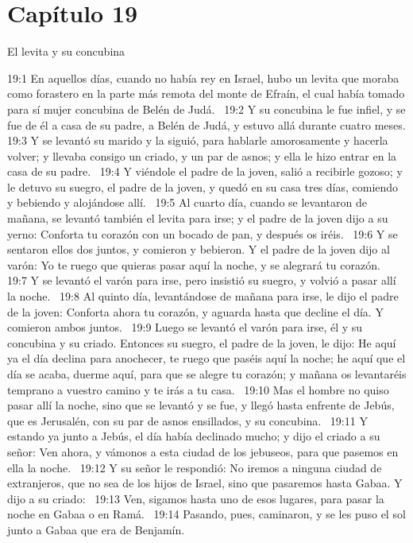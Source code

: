 \section*{Capítulo 19}
El levita y su concubina  

19:1 En aquellos días, cuando no había rey en Israel, hubo un levita que moraba como forastero en la parte más remota del monte de Efraín, el cual había tomado para sí mujer concubina de Belén de Judá.  
19:2 Y su concubina le fue infiel, y se fue de él a casa de su padre, a Belén de Judá, y estuvo allá durante cuatro meses. 
19:3 Y se levantó su marido y la siguió, para hablarle amorosamente y hacerla volver; y llevaba consigo un criado, y un par de asnos; y ella le hizo entrar en la casa de su padre.  
19:4 Y viéndole el padre de la joven, salió a recibirle gozoso; y le detuvo su suegro, el padre de la joven, y quedó en su casa tres días, comiendo y bebiendo y alojándose allí.  
19:5 Al cuarto día, cuando se levantaron de mañana, se levantó también el levita para irse; y el padre de la joven dijo a su yerno: Conforta tu corazón con un bocado de pan, y después os iréis.  
19:6 Y se sentaron ellos dos juntos, y comieron y bebieron. Y el padre de la joven dijo al varón: Yo te ruego que quieras pasar aquí la noche, y se alegrará tu corazón.  
19:7 Y se levantó el varón para irse, pero insistió su suegro, y volvió a pasar allí la noche.  
19:8 Al quinto día, levantándose de mañana para irse, le dijo el padre de la joven: Conforta ahora tu corazón, y aguarda hasta que decline el día. Y comieron ambos juntos.  
19:9 Luego se levantó el varón para irse, él y su concubina y su criado. Entonces su suegro, el padre de la joven, le dijo: He aquí ya el día declina para anochecer, te ruego que paséis aquí la noche; he aquí que el día se acaba, duerme aquí, para que se alegre tu corazón; y mañana os levantaréis temprano a vuestro camino y te irás a tu casa.  
19:10 Mas el hombre no quiso pasar allí la noche, sino que se levantó y se fue, y llegó hasta enfrente de Jebús, que es Jerusalén, con su par de asnos ensillados, y su concubina.  
19:11 Y estando ya junto a Jebús, el día había declinado mucho; y dijo el criado a su señor: Ven ahora, y vámonos a esta ciudad de los jebuseos, para que pasemos en ella la noche.  
19:12 Y su señor le respondió: No iremos a ninguna ciudad de extranjeros, que no sea de los hijos de Israel, sino que pasaremos hasta Gabaa. Y dijo a su criado:  
19:13 Ven, sigamos hasta uno de esos lugares, para pasar la noche en Gabaa o en Ramá.  
19:14 Pasando, pues, caminaron, y se les puso el sol junto a Gabaa que era de Benjamín.  
